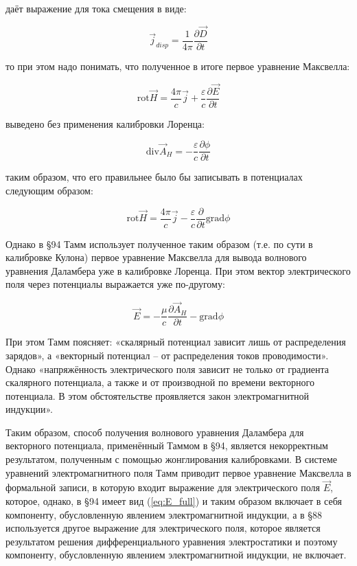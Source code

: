 \documentclass[12pt, a4paper]{article}
\begin{document}
даёт выражение для тока смещения в виде:

\begin{equation}
\vec{j}_{disp} = \frac{1}{4\pi} \frac{\partial \vec{D}}{\partial t}
\label{eq:tamm_disp_final}
\end{equation}

то при этом надо понимать, что полученное в итоге первое уравнение Максвелла:

\begin{equation}
\text{rot} \vec{H} = \frac{4\pi}{c} \vec{j} + \frac{\varepsilon}{c} \frac{\partial \vec{E}}{\partial t}
\label{eq:tamm_maxwell_final}
\end{equation}

выведено без применения калибровки Лоренца:

\begin{equation}
\text{div} \vec{A}_H = -\frac{\varepsilon}{c} \frac{\partial \phi}{\partial t}
\label{eq:lorentz_gauge}
\end{equation}

таким образом, что его правильнее было бы записывать в потенциалах следующим образом:

\begin{equation}
\text{rot} \vec{H} = \frac{4\pi}{c} \vec{j} - \frac{\varepsilon}{c} \frac{\partial}{\partial t} \text{grad} \phi
\label{eq:tamm_potentials_coulomb}
\end{equation}

Однако в §94 Тамм использует полученное таким образом (т.е. по сути в калибровке Кулона) первое уравнение Максвелла для вывода волнового уравнения Даламбера уже в калибровке Лоренца. При этом вектор электрического поля через потенциалы выражается уже по-другому:

\begin{equation}
\vec{E} = -\frac{\mu}{c} \frac{\partial \vec{A}_H}{\partial t} - \text{grad} \phi
\label{eq:E_full}
\end{equation}

При этом Тамм поясняет: «скалярный потенциал зависит лишь от распределения зарядов», а «векторный потенциал -- от распределения токов проводимости». Однако «напряжённость электрического поля зависит не только от градиента скалярного потенциала, а также и от производной по времени векторного потенциала. В этом обстоятельстве проявляется закон электромагнитной индукции».

Таким образом, способ получения волнового уравнения Даламбера для векторного потенциала, применённый Таммом в §94, является некорректным результатом, полученным с помощью жонглирования калибровками. В системе уравнений электромагнитного поля Тамм приводит первое уравнение Максвелла в формальной записи, в которую входит выражение для электрического поля $\vec{E}$, которое, однако, в §94 имеет вид (\ref{eq:E_full}) и таким образом включает в себя компоненту, обусловленную явлением электромагнитной индукции, а в §88 используется другое выражение для электрического поля, которое является результатом решения дифференциального уравнения электростатики и поэтому компоненту, обусловленную явлением электромагнитной индукции, не включает.
\end{document}
